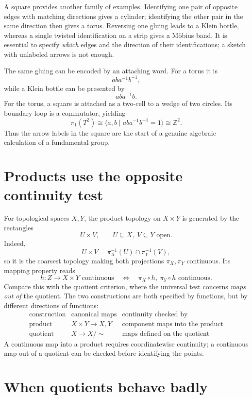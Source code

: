 A square provides another family of examples. Identifying one pair of opposite edges with matching directions gives a cylinder; identifying the other pair in the same direction then gives a torus. Reversing one gluing leads to a Klein bottle, whereas a single twisted identification on a strip gives a Möbius band. It is essential to specify \emph{which} edges and the direction of their identifications; a sketch with unlabeled arrows is not enough.

The same gluing can be encoded by an attaching word. For a torus it is
\[
 aba^{-1}b^{-1},
\]
while a Klein bottle can be presented by
\[
 aba^{-1}b.
\]
For the torus, a square is attached as a two-cell to a wedge of two circles. Its boundary loop is a commutator, yielding
\[
 \pi_1(T^2)\cong
 \langle a,b\mid aba^{-1}b^{-1}=1\rangle
 \cong\mathbb Z^2.
\]
Thus the arrow labels in the square are the start of a genuine algebraic calculation of a fundamental group.

\section{Products use the opposite continuity test}

For topological spaces \(X,Y\), the product topology on \(X\times Y\) is generated by the rectangles
\[
 U\times V,\qquad U\subseteq X,\;V\subseteq Y\text{ open}.
\]
Indeed,
\[
 U\times V=\pi_X^{-1}(U)\cap\pi_Y^{-1}(V),
\]
so it is the coarsest topology making both projections \(\pi_X,\pi_Y\) continuous. Its mapping property reads
\[
 h:Z\to X\times Y\text{ continuous}
 \quad\Longleftrightarrow\quad
 \pi_X\circ h,\ \pi_Y\circ h\text{ continuous}.
\]
Compare this with the quotient criterion, where the universal test concerns \emph{maps out of} the quotient. The two constructions are both specified by functions, but by different directions of functions:
\[
 \begin{array}{c|c|c}
 \text{construction}&\text{canonical maps}&\text{continuity checked by}\\ \hline
 \text{product}&X\times Y\to X,Y&\text{component maps into the product}\\
 \text{quotient}&X\to X/{\sim}&\text{maps defined on the quotient}
 \end{array}
\]
A continuous map into a product requires coordinatewise continuity; a continuous map out of a quotient can be checked before identifying the points.

\section{When quotients behave badly}


